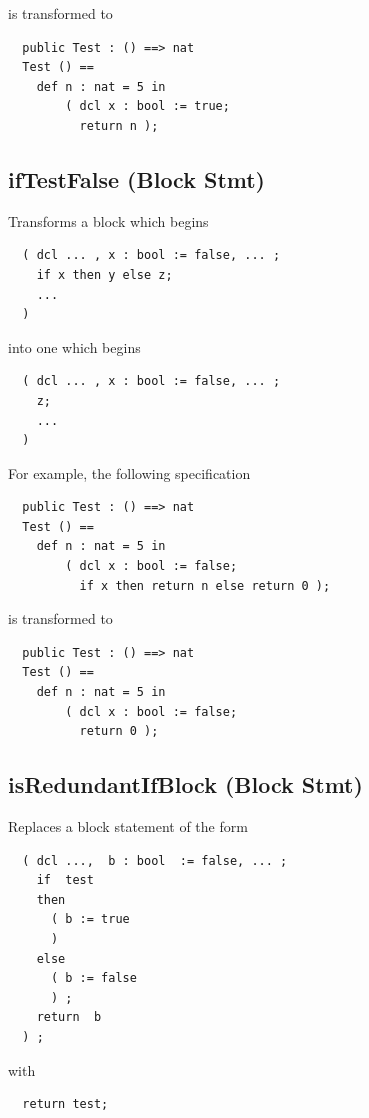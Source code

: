 \documentclass[\pformat,12pt]{article}
\begin{document}
is transformed to

\begin{verbatim}
  public Test : () ==> nat  
  Test () ==
    def n : nat = 5 in
        ( dcl x : bool := true;
          return n );
\end{verbatim}

\subsection{ifTestFalse (Block Stmt)}

  Transforms a block which begins

\begin{verbatim}
  ( dcl ... , x : bool := false, ... ; 
    if x then y else z;
    ...
  )
\end{verbatim}

into one which begins

\begin{verbatim}
  ( dcl ... , x : bool := false, ... ; 
    z;
    ...
  )
\end{verbatim}

For example, the following specification

\begin{verbatim}
  public Test : () ==> nat  
  Test () ==
    def n : nat = 5 in
        ( dcl x : bool := false;
          if x then return n else return 0 );
\end{verbatim}

is transformed to

\begin{verbatim}
  public Test : () ==> nat  
  Test () ==
    def n : nat = 5 in
        ( dcl x : bool := false;
          return 0 );
\end{verbatim}


\subsection{isRedundantIfBlock (Block Stmt)}
  Replaces a block statement of the form 

\begin{verbatim}
  ( dcl ...,  b : bool  := false, ... ;
    if  test 
    then  
      ( b := true  
      ) 
    else  
      ( b := false  
      ) ;
    return  b
  ) ;
\end{verbatim}
  
with 

\begin{verbatim}
  return test;
\end{verbatim}
\end{document}
